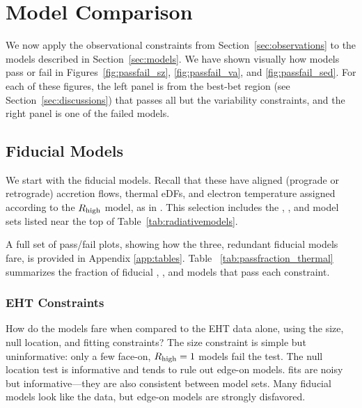 \section{Model Comparison}\label{sec:comparisons}

We now apply the observational constraints from Section~\ref{sec:observations} to the models described in Section~\ref{sec:models}.  We have shown visually how models pass or fail in Figures~\ref{fig:passfail_sz}, \ref{fig:passfail_va}, and \ref{fig:passfail_sed}.  For each of these figures, the left panel is from the best-bet region (see Section~\ref{sec:discussions}) that passes all but the variability constraints, and the right panel is one of the failed models.

\subsection{Fiducial Models}\label{subsec:thermal}

We start with the fiducial models.  Recall that these have aligned (prograde or retrograde) accretion flows, thermal eDFs, and electron temperature assigned according to the $R_\mathrm{high}$ model, as in .  This selection includes the \kharma, \bhac, and \hamr model sets listed near the top of Table~\ref{tab:radiativemodels}.  

A full set of pass/fail plots, showing how the three, redundant fiducial models fare, is provided in Appendix \ref{app:tables}. Table ~\ref{tab:passfraction_thermal} summarizes the fraction of fiducial \kharma, \bhac, and \hamr models that pass each constraint. 



\subsubsection{EHT Constraints}

How do the models fare when compared to the EHT data alone, using the size, null location, and \mring fitting constraints?  The size constraint is simple but uninformative: only a few face-on, $R_\mathrm{high} = 1$ models fail the test.  The null location test is informative and tends to rule out edge-on models.  \Mring fits are noisy but informative---they are also consistent between model sets.  Many fiducial models look like the data, but edge-on models are strongly disfavored.

